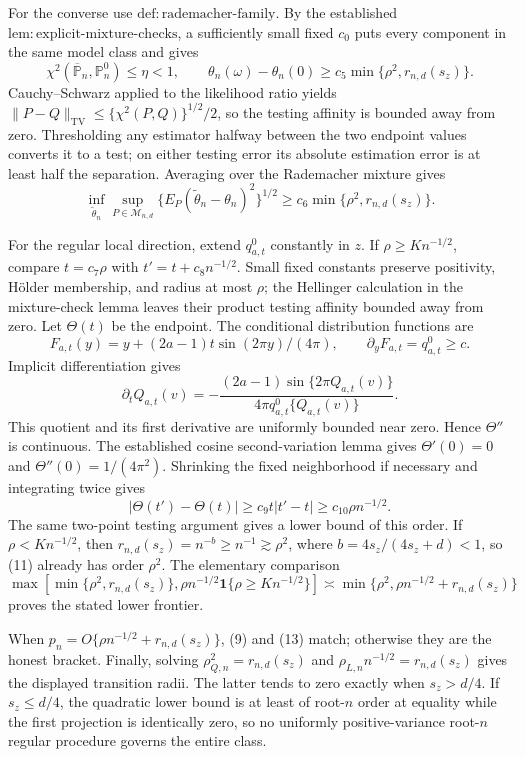 For the converse use \(\mathrm{def{:}rademacher\text{-}family}\).  By the established \(\mathrm{lem{:}explicit\text{-}mixture\text{-}checks}\), a sufficiently small fixed \(c_0\) puts every component in the same model class and gives
\[
\chi^2(\overline{\mathbb P}_n,\mathbb P_n^0)\le\eta<1,
\qquad
\theta_n(\omega)-\theta_n(0)\ge c_5\min\{\rho^2,r_{n,d}(s_z)\}.        \tag{10}
\]
Cauchy--Schwarz applied to the likelihood ratio yields \(\|P-Q\|_{\mathrm{TV}}\le\{\chi^2(P,Q)\}^{1/2}/2\), so the testing affinity is bounded away from zero.  Thresholding any estimator halfway between the two endpoint values converts it to a test; on either testing error its absolute estimation error is at least half the separation.  Averaging over the Rademacher mixture gives
\[
\inf_{\widetilde\theta_n}\sup_{P\in\mathcal M_{n,d}}
\{E_P(\widetilde\theta_n-\theta_n)^2\}^{1/2}
\ge c_6\min\{\rho^2,r_{n,d}(s_z)\}.                                    \tag{11}
\]

For the regular local direction, extend \(q_{a,t}^{0}\) constantly in \(z\).  If \(\rho\ge Kn^{-1/2}\), compare \(t=c_7\rho\) with \(t'=t+c_8n^{-1/2}\).  Small fixed constants preserve positivity, H\"older membership, and radius at most \(\rho\); the Hellinger calculation in the mixture-check lemma leaves their product testing affinity bounded away from zero.  Let \(\Theta(t)\) be the endpoint.  The conditional distribution functions are
\[
F_{a,t}(y)=y+(2a-1)t\sin(2\pi y)/(4\pi),
\qquad \partial_yF_{a,t}=q_{a,t}^{0}\ge c.
\]
Implicit differentiation gives
\[
\partial_tQ_{a,t}(v)
=-\frac{(2a-1)\sin\{2\pi Q_{a,t}(v)\}}
{4\pi q_{a,t}^{0}\{Q_{a,t}(v)\}}.
\]
This quotient and its first derivative are uniformly bounded near zero.  Hence \(\Theta''\) is continuous.  The established cosine second-variation lemma gives \(\Theta'(0)=0\) and \(\Theta''(0)=1/(4\pi^2)\).  Shrinking the fixed neighborhood if necessary and integrating twice gives
\[
|\Theta(t')-\Theta(t)|\ge c_9t|t'-t|\ge c_{10}\rho n^{-1/2}.             \tag{12}
\]
The same two-point testing argument gives a lower bound of this order.  If \(\rho<Kn^{-1/2}\), then \(r_{n,d}(s_z)=n^{-b}\ge n^{-1}\gtrsim\rho^2\), where \(b=4s_z/(4s_z+d)<1\), so (11) already has order \(\rho^2\).  The elementary comparison
\[
\max\!\left[\min\{\rho^2,r_{n,d}(s_z)\},
\rho n^{-1/2}\mathbf1\{\rho\ge Kn^{-1/2}\}\right]
\asymp\min\{\rho^2,\rho n^{-1/2}+r_{n,d}(s_z)\}                         \tag{13}
\]
proves the stated lower frontier.

When \(p_n=O\{\rho n^{-1/2}+r_{n,d}(s_z)\}\), (9) and (13) match; otherwise they are the honest bracket.  Finally, solving \(\rho_{Q,n}^2=r_{n,d}(s_z)\) and \(\rho_{L,n}n^{-1/2}=r_{n,d}(s_z)\) gives the displayed transition radii.  The latter tends to zero exactly when \(s_z>d/4\).  If \(s_z\le d/4\), the quadratic lower bound is at least of root-\(n\) order at equality while the first projection is identically zero, so no uniformly positive-variance root-\(n\) regular procedure governs the entire class.